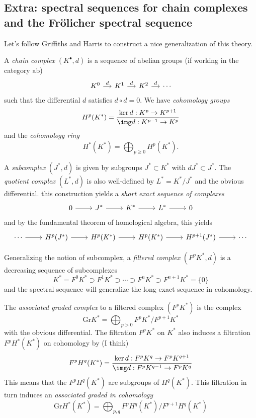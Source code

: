 \begin{definition}
\subsection{Extra: spectral sequences for chain complexes and the Fr\"olicher spectral sequence}
Let's follow Griffiths and Harris to construct a nice generalization of this theory.

A {\it chain complex} $(K^\bullet,d)$ is a sequence of abelian groups (if working in the category $\text{ab}$)
$$\begin{tikzcd}[column sep=small]
	K^{0}\arrow[r,"d"]&K^{1}\arrow[r,"d"]&K^2\arrow[r,"d"]&\cdots
\end{tikzcd}$$
such that the differential $d$ satisfies $d\circ d=0$. We have {\it cohomology groups} 
$$H^{p}(K^*)=\frac{\ker d:K^p\to K^{p+1}}{\img d:K^{p-1}\to K^p}$$
and the {\it cohomology ring}
$$H^{*}(K^*)=\bigoplus_{p\geq 0} H^{p}(K^*).$$

A {\it subcomplex} $(J^*,d)$ is given by subgroups $J^*\subset K^*$
 with $dJ^*\subset J^*$.
The {\it quotient complex} $(L^*,d)$ is also well-defined by $L^*=K^*/J^*$ and the obvious differential. this construction yields a {\it short exact sequence of complexes}
$$\begin{tikzcd}
	0\arrow[r]&J^*\arrow[r]&K^*\arrow[r]&L^*\arrow[r]&0
\end{tikzcd}$$
and by the fundamental theorem of homological algebra, this yields
$$\begin{tikzcd}
	\cdots\arrow[r]&H^{p}(J^*)\arrow[r]&H^{p}(K^*)\arrow[r]&H^{p}(K^*)\arrow[r]&H^{p+1}(J^*)\arrow[r]&\cdots
\end{tikzcd}$$

Generalizing the notion of subcomplex, a {\it filtered complex} $(F^pK^*,d)$ is a decreasing sequence of subcomplexes
$$K^*=F^0K^*\supset F^1K^*\supset\cdots\supset F^nK^*\supset F^{n+1}K^*=\{0\}$$
and the spectral sequence will generalize the long exact sequence in cohomology.

The {\it associated graded complex} to a filtered complex $ (F^pK^*)$ is the complex
$$\text{Gr}K^*=\bigoplus_{p>0} F^pK^*/F^{p+1}K^* $$
with the obvious differential. The filtration $F^pK^*$ on $K^*$ also induces a filtration $F^pH^*(K^*)$ on cohomology by {\color{blue}(I think)}
$$F^pH^q(K^*)=\frac{\ker d:F^pK^q\to F^pK^{q+1}}{\img d:F^pK^{q-1}\to F^pK^q}$$
This means that the $F^pH^q(K^*)$ are subgroups of $H^{q}(K^*)$. This filtration in turn induces an {\it associated graded in cohomology}
$$\text{Gr}H^*(K^*)=\bigoplus_{p,q}F^pH^q(K^*)\big/F^{p+1}H^q(K^*)  $$


\end{definition}
